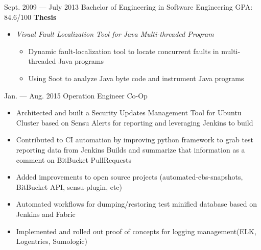 \documentclass{newresume}
\begin{document}
\begin{body}
	{Sept. 2009 --- July 2013}
	{Bachelor of Engineering in Software Engineering}
	{GPA: 84.6/100}
	\textbf{Thesis}
	\begin{itemize}
	\item \textit{Visual Fault Localization Tool for Java Multi-threaded Program}
	\begin{itemize}
		\item Dynamic fault-localization tool to locate concurrent faults in multi-threaded Java programs
		\item Using Soot to analyze Java byte code and instrument Java programs
	\end{itemize}
	\end{itemize}
\end{body}

\smallskip

\begin{body}
	{Jan. --- Aug. 2015}
	{Operation Engineer Co-Op}
	{}
	\begin{itemize}[noitemsep,topsep=0pt]
		\item Architected and built a Security Updates Management Tool for Ubuntu Cluster based on Sensu Alerts for reporting and leveraging Jenkins to build
		\item Contributed to CI automation by improving python framework to grab test reporting data from Jenkins Builds and summarize that information as a comment on BitBucket PullRequests
		\item Added improvements to open source projects (automated-ebs-snapshots, BitBucket API, sensu-plugin, etc)
		\item Automated workflows for dumping/restoring test minified database based on Jenkins and Fabric
		\item Implemented and rolled out proof of concepts for logging management(ELK, Logentries, Sumologic)
	\end{itemize}
\end{body}
\end{document}
